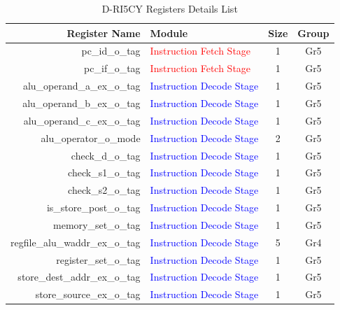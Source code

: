 \begin{table}
    \centering
    \scriptsize
    \caption{D-RI5CY Registers Details List}
    \label{tab:driscy_register_info}
    \begin{tabular}{rlcc}
        \toprule
        Register Name                   & Module                                            & Size & Group \\
        \midrule
        pc\_id\_o\_tag                  & \textcolor{red}{Instruction Fetch Stage}          & 1    & Gr5   \\
        pc\_if\_o\_tag                  & \textcolor{red}{Instruction Fetch Stage}          & 1    & Gr5   \\\hdashline
        alu\_operand\_a\_ex\_o\_tag     & \textcolor{blue}{Instruction Decode Stage}        & 1    & Gr5   \\
        alu\_operand\_b\_ex\_o\_tag     & \textcolor{blue}{Instruction Decode Stage}        & 1    & Gr5   \\
        alu\_operand\_c\_ex\_o\_tag     & \textcolor{blue}{Instruction Decode Stage}        & 1    & Gr5   \\
        alu\_operator\_o\_mode          & \textcolor{blue}{Instruction Decode Stage}        & 2    & Gr5   \\
        check\_d\_o\_tag                & \textcolor{blue}{Instruction Decode Stage}        & 1    & Gr5   \\
        check\_s1\_o\_tag               & \textcolor{blue}{Instruction Decode Stage}        & 1    & Gr5   \\
        check\_s2\_o\_tag               & \textcolor{blue}{Instruction Decode Stage}        & 1    & Gr5   \\
        is\_store\_post\_o\_tag         & \textcolor{blue}{Instruction Decode Stage}        & 1    & Gr5   \\
        memory\_set\_o\_tag             & \textcolor{blue}{Instruction Decode Stage}        & 1    & Gr5   \\
        regfile\_alu\_waddr\_ex\_o\_tag & \textcolor{blue}{Instruction Decode Stage}        & 5    & Gr4   \\
        register\_set\_o\_tag           & \textcolor{blue}{Instruction Decode Stage}        & 1    & Gr5   \\
        store\_dest\_addr\_ex\_o\_tag   & \textcolor{blue}{Instruction Decode Stage}        & 1    & Gr5   \\
        store\_source\_ex\_o\_tag       & \textcolor{blue}{Instruction Decode Stage}        & 1    & Gr5   \\

\end{tabular}
\end{table}

